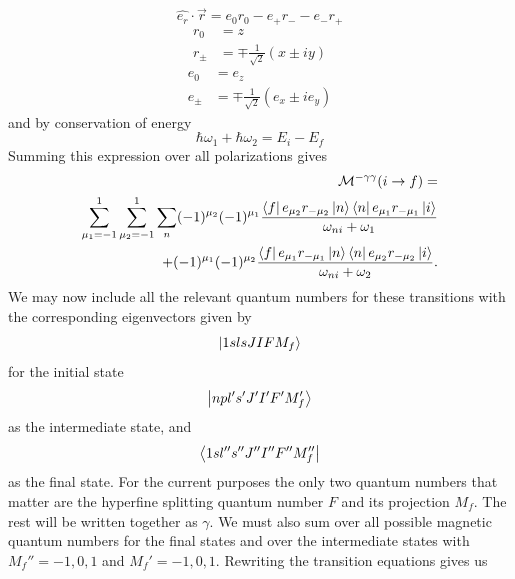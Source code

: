 \begin{equation}
    \hat{e_r}\cdot\Vec{r}= e_0r_0-e_+r_--e_-r_+
\end{equation}
\begin{equation}
    \begin{split}
        r_0&=z\\
        r_{\pm}&=\mp \frac{1}{\sqrt{2}}(x\pm iy)
    \end{split}
\end{equation}
\begin{equation}
    \begin{split}
        e_0&=e_z\\
        e_{\pm}&=\mp \frac{1}{\sqrt{2}}(e_x\pm ie_y)
    \end{split}
\end{equation}
and by conservation of energy
\begin{equation}
    \hbar \omega_1+\hbar \omega_2= E_i -E_f
\end{equation}
Summing this expression over all polarizations gives
\begin{equation}
\begin{split}
    \mathcal{M}^{-\gamma\gamma}(i\rightarrow f)=\\
    \sum_{\mu_1=-1}^1
    \sum_{\mu_2=-1}^1
    \sum_{n}
    (-1)^{\mu_2}(-1)^{\mu_1}
    \frac{
    \bra{f}{e}_{\mu_2}
    {r}_{-\mu_2}\ket{n}
    \bra{n}{e}_{\mu_1}{r}_{-\mu_1}\ket{i}}
    {\omega_{ni}+\omega_{1}}\\
    +(-1)^{\mu_1}(-1)^{\mu_2}
    \frac{
    \bra{f}{e}_{\mu_1}{r}_{-\mu_1}\ket{n}
    \bra{n}{e}_{\mu_2}{r_{-\mu_2}}\ket{i}}
    {\omega_{ni}+\omega_{2}}.
    \end{split}
\end{equation}
We may now include all the relevant quantum numbers for these transitions with the corresponding eigenvectors given by
\begin{equation}
    \ket{1s l s J I F M_f}
\end{equation}
for the initial state
\begin{equation}
    \ket{np l's'J'I'F'M_f'}
\end{equation}
as the intermediate state, and
\begin{equation}
        \bra{1s l'' s'' J'' I'' F'' M_f''}
\end{equation}
as the final state.
For the current purposes the only two quantum numbers that matter are the hyperfine splitting quantum number $F$ and its projection \(M_f\). The rest will be written together as \(\gamma\). We must also sum over all possible magnetic quantum numbers for the final states and  over the intermediate states with \(M_f''=-1,0,1\) and \(M_f'=-1,0,1\). Rewriting the transition equations gives us
